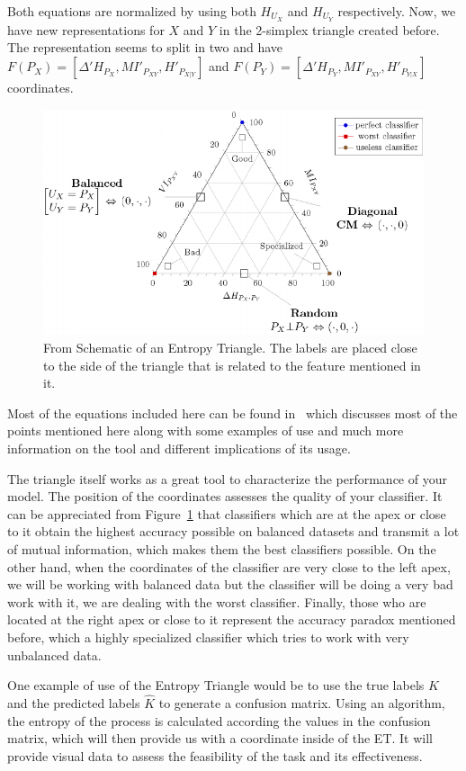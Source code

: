 Both equations are normalized by using both $H_{U_{X}}$ and $H_{U_{Y}}$ respectively. Now, we have new representations for $X$ and $Y$ in the 2-simplex triangle created before. The representation seems to split in two and have $F(P_X) = [\Delta'H_{P_{X}},MI'_{P_{XY}},H'_{P_{X|Y}}] $ and $F(P_Y) = [\Delta'H_{P_{Y}},MI'_{P_{XY}},H'_{P_{Y|X}}]$ coordinates.\newline
%
\begin{figure}[H]
 \centering
  \includegraphics[width=15cm]{Figuras_tfg/ET_Labelled.png}
  \caption{From \cite{val:pel:18c} Schematic of an Entropy Triangle. The labels are placed close to the side of the triangle that is related to the feature mentioned in it.}
 \label{fig:figure_labelled_et}
\end{figure} 

Most of the equations included here can be found in~\cite{val:pel:18c} which discusses most of the points mentioned here along with some examples of use and much more information on the tool and different implications of its usage. %

The triangle itself works as a great tool to characterize the performance of your model. The position of the coordinates assesses the quality of your classifier. It can be appreciated from Figure~\ref{fig:figure_labelled_et} that classifiers which are at the apex or close to it obtain the highest accuracy possible on balanced datasets and transmit a lot of mutual information, which makes them the best classifiers possible. On the other hand, when the coordinates of the classifier are very close to the left apex, we will be working with balanced data but the classifier will be doing a very bad work with it, we are dealing with the worst classifier. Finally, those who are located at the right apex or close to it represent the accuracy paradox mentioned before, which a highly specialized classifier which tries to work with very unbalanced data. %

One example of use of the Entropy Triangle would be to use the true labels $K$ and the predicted labels $\hat{K}$ to generate a confusion matrix. Using an algorithm, the entropy of the process is calculated according the values in the confusion matrix, which will then provide us with a coordinate inside of the ET. It will provide visual data to assess the feasibility of the task and its effectiveness. %




